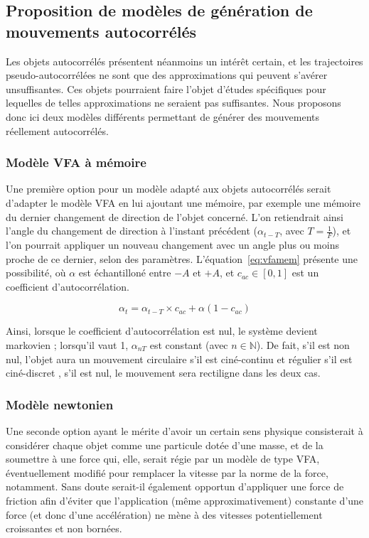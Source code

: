     \subsection{Proposition de modèles de génération de mouvements autocorrélés}
    Les objets autocorrélés présentent néanmoins un intérêt certain, et les trajectoires pseudo-autocorrélées ne sont que des approximations qui peuvent s'avérer unsuffisantes. Ces objets pourraient faire l'objet d'études spécifiques pour lequelles de telles approximations ne seraient pas suffisantes. Nous proposons donc ici deux modèles différents permettant de générer des mouvements réellement autocorrélés.
    
    \subsubsection{Modèle VFA à mémoire}
    Une première option pour un modèle adapté aux objets autocorrélés serait d'adapter le modèle VFA en lui ajoutant une mémoire, par exemple une mémoire du dernier changement de direction de l'objet concerné. L'on retiendrait ainsi l'angle du changement de direction à l'instant précédent ($\alpha_{t-T}$, avec $T = \frac{1}{F}$), et l'on pourrait appliquer un nouveau changement avec un angle plus ou moins proche de ce dernier, selon des paramètres. L'équation~\ref{eq:vfamem} présente une possibilité, où $\alpha$ est échantilloné entre $-A$ et $+A$, et $c_{ac} \in [0,1]$ est un coefficient d'autocorrélation.
    
    \begin{equation}
		\alpha_{t} = \alpha_{t-T} \times c_{ac} + \alpha (1 - c_{ac})
		\label{eq:vfamem}
    \end{equation}
    
	Ainsi, lorsque le coefficient d'autocorrélation est nul, le système devient markovien ; lorsqu'il vaut 1, $\alpha_{nT}$ est constant (avec $n \in \mathbb{N}$). De fait, s'il est non nul, l'objet aura un mouvement circulaire s'il est ciné-continu et régulier s'il est ciné-discret , s'il est nul, le mouvement sera rectiligne dans les deux cas.
    
    \subsubsection{Modèle newtonien}
    Une seconde option ayant le mérite d'avoir un certain sens physique consisterait à considérer chaque objet comme une particule dotée d'une masse, et de la soumettre à une force qui, elle, serait régie par un modèle de type VFA, éventuellement modifié pour remplacer la vitesse par la norme de la force, notamment. Sans doute serait-il également opportun d'appliquer une force de friction afin d'éviter que l'application (même approximativement) constante d'une force (et donc d'une accélération\footnotemark{}) ne mène à des vitesses potentiellement croissantes et non bornées.
    
